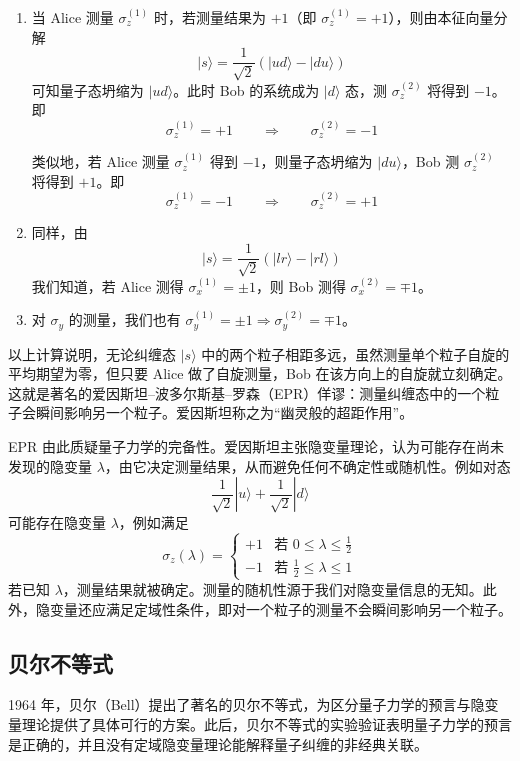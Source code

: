 \begin{enumerate}[label=\arabic*.,leftmargin=2.2em,itemsep=2pt]
  \item 当 Alice 测量 \(\sigma_z^{(1)}\) 时，若测量结果为 \(+1\)（即 \(\sigma_z^{(1)}=+1\)），则由本征向量分解
  \[
    |s\rangle=\frac{1}{\sqrt2}\left(|ud\rangle-|du\rangle\right)
  \]
  可知量子态坍缩为 \(|ud\rangle\)。此时 Bob 的系统成为 \(|d\rangle\) 态，测 \(\sigma_z^{(2)}\) 将得到 \(-1\)。即
  \[
    \sigma_z^{(1)}=+1\qquad\Longrightarrow\qquad \sigma_z^{(2)}=-1
  \]

  类似地，若 Alice 测量 \(\sigma_z^{(1)}\) 得到 \(-1\)，则量子态坍缩为 \(|du\rangle\)，Bob 测 \(\sigma_z^{(2)}\) 将得到 \(+1\)。即
  \[
    \sigma_z^{(1)}=-1\qquad\Longrightarrow\qquad \sigma_z^{(2)}=+1
  \]

  \item 同样，由
  \[
    |s\rangle=\frac{1}{\sqrt2}\left(|lr\rangle-|rl\rangle\right)
  \]
  我们知道，若 Alice 测得 \(\sigma_x^{(1)}=\pm1\)，则 Bob 测得 \(\sigma_x^{(2)}=\mp1\)。
  \item 对 \(\sigma_y\) 的测量，我们也有 \(\sigma_y^{(1)}=\pm1\Rightarrow\sigma_y^{(2)}=\mp1\)。
\end{enumerate}

以上计算说明，无论纠缠态 \(|s\rangle\) 中的两个粒子相距多远，虽然测量单个粒子自旋的平均期望为零，但只要 Alice 做了自旋测量，Bob 在该方向上的自旋就立刻确定。这就是著名的爱因斯坦–波多尔斯基–罗森（EPR）佯谬：测量纠缠态中的一个粒子会瞬间影响另一个粒子。爱因斯坦称之为“幽灵般的超距作用”。

EPR 由此质疑量子力学的完备性。爱因斯坦主张隐变量理论，认为可能存在尚未发现的隐变量 \(\lambda\)，由它决定测量结果，从而避免任何不确定性或随机性。例如对态
\[
  \frac{1}{\sqrt2}|u\rangle+\frac{1}{\sqrt2}|d\rangle
\]
可能存在隐变量 \(\lambda\)，例如满足
\[
  \sigma_z(\lambda)=
  \begin{cases}
    +1 & \text{若 } 0\le\lambda\le\frac{1}{2}\\[4pt]
    -1 & \text{若 } \frac{1}{2}\le\lambda\le1
  \end{cases}
\]
若已知 \(\lambda\)，测量结果就被确定。测量的随机性源于我们对隐变量信息的无知。此外，隐变量还应满足定域性条件，即对一个粒子的测量不会瞬间影响另一个粒子。

\subsection{贝尔不等式}

1964 年，贝尔（Bell）提出了著名的贝尔不等式，为区分量子力学的预言与隐变量理论提供了具体可行的方案。此后，贝尔不等式的实验验证表明量子力学的预言是正确的，并且没有定域隐变量理论能解释量子纠缠的非经典关联。

